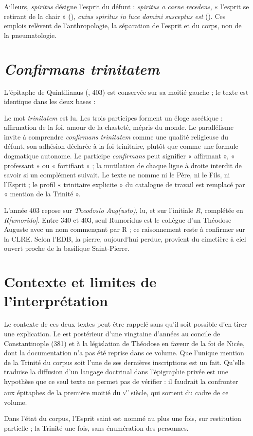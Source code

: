 Ailleurs, \emph{spiritus} désigne l’esprit du défunt : \emph{spiritus a carne recedens}, « l’esprit se retirant de la chair » (), \emph{cuius spiritus in luce domini susceptus est} (). Ces emplois relèvent de l’anthropologie, la séparation de l’esprit et du corps, non de la pneumatologie.

\section{\emph{Confirmans trinitatem}}

L’épitaphe de Quintilianus (, 403) est conservée sur sa moitié gauche ; le texte est identique dans les deux bases :

\begin{quote}\small
{}
\end{quote}

Le mot \emph{trinitatem} est lu. Les trois participes forment un éloge ascétique : affirmation de la foi, amour de la chasteté, mépris du monde. Le parallélisme invite à comprendre \emph{confirmans trinitatem} comme une qualité religieuse du défunt, son adhésion déclarée à la foi trinitaire, plutôt que comme une formule dogmatique autonome. Le participe \emph{confirmans} peut signifier « affirmant », « professant » ou « fortifiant » ; la mutilation de chaque ligne à droite interdit de savoir si un complément suivait. Le texte ne nomme ni le Père, ni le Fils, ni l’Esprit ; le profil « trinitaire explicite » du catalogue de travail est remplacé par « mention de la Trinité ».

L’année 403 repose sur \emph{Theodosio Aug(usto)}, lu, et sur l’initiale \emph{R}, complétée en \emph{R[umorido]}. Entre 340 et 403, seul Rumoridus est le collègue d’un Théodose Auguste avec un nom commençant par R ; ce raisonnement reste à confirmer sur la CLRE. Selon l’EDB, la pierre, aujourd’hui perdue, provient du cimetière à ciel ouvert proche de la basilique Saint-Pierre.

\section{Contexte et limites de l’interprétation}

Le contexte de ces deux textes peut être rappelé sans qu’il soit possible d’en tirer une explication. Le  est postérieur d’une vingtaine d’années au concile de Constantinople (381) et à la législation de Théodose en faveur de la foi de Nicée, dont la documentation n’a pas été reprise dans ce volume. Que l’unique mention de la Trinité du corpus soit l’une de ses dernières inscriptions est un fait. Qu’elle traduise la diffusion d’un langage doctrinal dans l’épigraphie privée est une hypothèse que ce seul texte ne permet pas de vérifier : il faudrait la confronter aux épitaphes de la première moitié du \textsc{v}\textsuperscript{e} siècle, qui sortent du cadre de ce volume.

Dans l’état du corpus, l’Esprit saint est nommé au plus une fois, sur restitution partielle ; la Trinité une fois, sans énumération des personnes.
